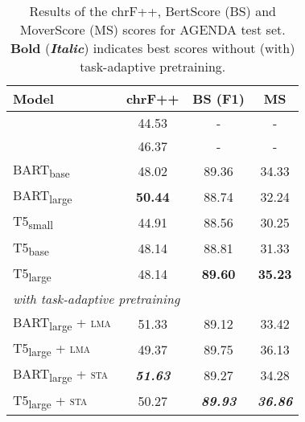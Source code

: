 \documentclass[11pt]{article}
\begin{document}
\begin{table}[h]
{\renewcommand{\arraystretch}{0.6}
\begin{tabular}{@{\hspace*{1mm}}l@{\hspace*{1mm}}ccc@{\hspace*{1mm}}}  
\toprule
\textbf{Model} & \textbf{chrF++} & \textbf{BS (F1)} & \textbf{MS}  \\
\midrule
\citet{schmitt2020modeling} & 44.53 & -& -\\
\citet{ribeiro-etal-2020-modeling} & 46.37 & -& - \\
\midrule
BART\textsubscript{base} & 48.02 & 89.36 & 34.33 \\
BART\textsubscript{large} & \textbf{50.44} & 88.74 & 32.24 \\
T5\textsubscript{small}  & 44.91 & 88.56 & 30.25 \\
T5\textsubscript{base} & 48.14 &  88.81 & 31.33 \\
T5\textsubscript{large} &  48.14 & \textbf{89.60} & \textbf{35.23} \\
\midrule
\multicolumn{2}{l}{\small{\textit{with task-adaptive pretraining}}}  \\[.2em]
BART\textsubscript{large} + \textsc{lma} & 51.33 & 89.12 & 33.42 \\
T5\textsubscript{large} + \textsc{lma} & 49.37 & 89.75 & 36.13 \\[.7em]
BART\textsubscript{large} + \textsc{sta} & \textbf{\textit{51.63}} & 89.27 & 34.28 \\
T5\textsubscript{large} + \textsc{sta} & 50.27 & \textbf{\textit{89.93}} & \textbf{\textit{36.86}} \\
\bottomrule
\end{tabular}}
\caption{Results of the chrF++, BertScore (BS) and MoverScore (MS) scores for AGENDA test set. \textbf{Bold} (\textbf{\textit{Italic}}) indicates best scores without (with) task-adaptive pretraining.}
\label{tab:results-agenda-appendix}
\end{table}
\end{document}
